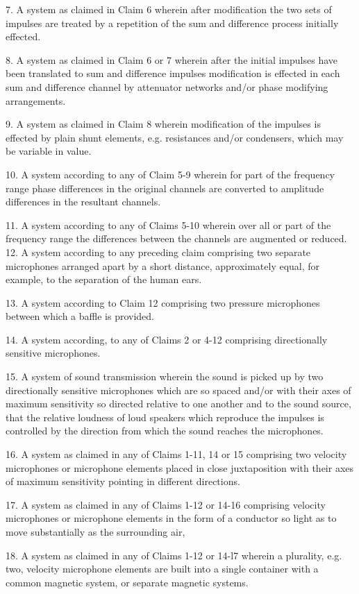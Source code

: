 \documentclass[11pt]{article}
\begin{document}
\begin{multicols*}{2}
7. A system as claimed in Claim 6 wherein after modification the two sets of impulses are treated by a repetition of the sum and difference process initially effected.

8.  A system as claimed in Claim 6 or 7 wherein after the initial impulses have been translated to sum and difference impulses modification is effected in each sum and difference channel by attenuator networks and/or phase modifying arrangements.

9. A system as claimed in Claim 8 wherein modification of the impulses is effected by plain shunt elements, e.g. resistances and/or condensers, which may be variable in value. 

10.  A system according to any of Claim 5-9 wherein for part of the frequency range phase differences in the original channels are converted to amplitude differences in the resultant channels.

11. A system according to any of Claims 5-10 wherein over all or part of the frequency range the differences between the channels are augmented or reduced.
12. A system according to any preceding claim comprising two separate microphones arranged apart by a short distance, approximately equal, for example, to the separation of the human ears. 

13. A system according to Claim 12 comprising two pressure microphones between which a baffle is provided.

14. A system according, to any of Claims 2 or 4-12 comprising directionally sensitive microphones. 

15. A system of sound transmission wherein the sound is picked up by two directionally sensitive microphones which are so spaced and/or with their axes of maximum sensitivity so directed relative to one another and to the sound source, that the relative loudness of loud speakers which reproduce the impulses is controlled by the direction from which the sound reaches the microphones.

16. A system as claimed in any of Claims 1-11, 14 or 15 comprising two velocity microphones or microphone elements placed in close juxtaposition with their axes of maximum sensitivity pointing in different directions.

17. A system as claimed in any of Claims 1-12 or 14-16 comprising velocity microphones or microphone elements in the form of a conductor so light as to move substantially as the surrounding air, 

18. A system as claimed in any of Claims 1-12 or 14-l7 wherein a plurality, e.g. two, velocity microphone elements are built into a single container with a common magnetic system, or separate magnetic systems.
 

\end{multicols*}
\end{document}
